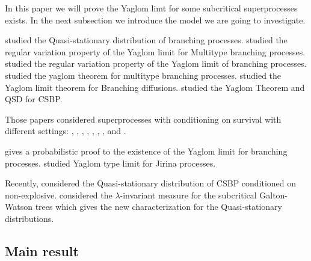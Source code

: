 \documentclass[12pt,a4paper]{amsart}
\numberwithin{equation}{section}
\theoremstyle{plain}
\theoremstyle{definition}
\theoremstyle{remark}
\begin{document}
	In this paper we will prove the Yaglom limt for some subcritical superprocesses exists. In the next subsection we introduce the model we are going to investigate. 
	
	\cite{HoppeSeneta1978Analytical} studied the Quasi-stationary distribution of branching processes.
	\cite{Hoppe1975Stationary} studied the regular variation property of the Yaglom limit for Multitype branching processes.
	\cite{Seneta1974Regularly} studied the regular variation property of the Yaglom limit of branching processes.
	\cite{JoffeSpitzer1967On} studied the yaglom theorem for multitype branching processes.
	\cite{Hering1977Subcritical} studied the Yaglom limit theorem for Branching diffusions.
	\cite{Lambert2007Quasi-stationary} studied the Yaglom Theorem and QSD for CSBP.
	
	Those papers considered superprocesses with conditioning on survival with different settings: \cite{Etheridge2003A-decomposition}, \cite{Evans1992The-entrance}, \cite{EvansPerkins1990Measure-valued},
	\cite{Serlet1996Occupation}, \cite{LiuRen2009Some}, \cite{RenSongZhang2015Limit}, \cite{RenSongSun2019Spine}, \cite{RenSongSun2018Limit} and \cite{ChampagnatRaelly2008Limit}.
	
	\cite{LyonsPemantlePeres1995Conceptual} gives a probabilistic proof to the existence of the Yaglom limit for branching processes.
	\cite{SenetaVere-Jones1968On} studied Yaglom type limit for Jirina processes.
	
	Recently, \cite{Labbe2013Quasi-stationary} considered the Quasi-stationary distribution of CSBP conditioned on non-explosive.
	\cite{Maillard2018The} considered the $\lambda$-invariant measure for the subcritical Galton-Watson trees which gives the new characterization for the Quasi-stationary distributions.

\subsection{Main result} \label{sec:super}
\end{document}
